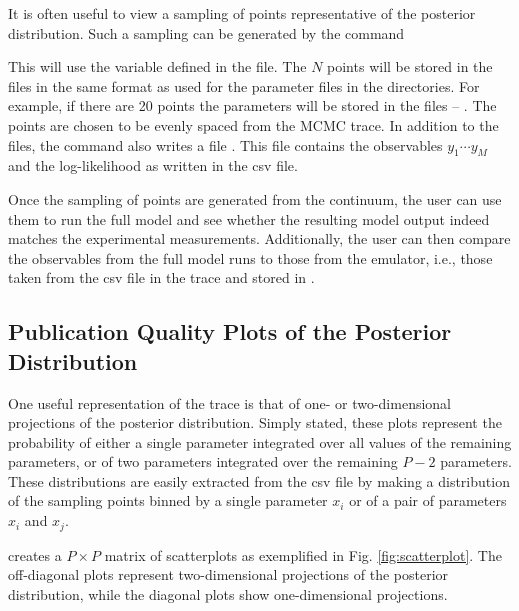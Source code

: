  It is often useful to view a sampling of points
 representative of the posterior distribution. Such a
 sampling can be generated by the command


 This will use the variable
 defined in the  file. The $N$ points will
 be stored in the files in the same format as used for the
 parameter files in the  directories. For
 example, if there are 20 points the parameters will be
 stored in the files 
  --
  . The
 points are chosen to be evenly spaced from the MCMC
 trace. In addition to the  files, the
 command also writes a file
 . This
 file contains the observables $y_1\cdots y_M$ and the
 log-likelihood as written in the csv file.

 Once the sampling of points are generated from the
 continuum, the user can use them to run the full model and
 see whether the resulting model output indeed matches the
 experimental measurements. Additionally, the user can then
 compare the observables from the full model runs to those
 from the emulator, i.e., those taken from the csv file in
 the trace and stored in
 .

\subsection{Publication Quality Plots of the Posterior Distribution}\label{subsec:PublicationQualityPlots}

One useful representation of the trace is that of one- or two-dimensional projections of the posterior distribution. Simply stated, these plots represent the probability of either a single parameter integrated over all values of the remaining parameters, or of two parameters integrated over the remaining $P-2$ parameters. These distributions are easily extracted from the csv file by making a distribution of the sampling points binned by a single parameter $x_i$ or of a pair of parameters $x_i$ and $x_j$.

creates a $P\times P$ matrix of scatterplots as exemplified in Fig. \ref{fig:scatterplot}. The off-diagonal plots represent two-dimensional projections of the posterior distribution, while the diagonal plots show one-dimensional projections. 

